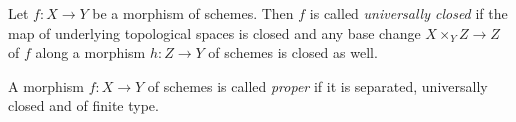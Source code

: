 
\begin{definition}
	Let $f\colon X\to Y$ be a morphism of schemes. Then $f$ is called \emph{universally closed} if the map of underlying topological spaces is closed and any base change $X\times_Y Z\to Z$ of $f$ along a morphism $h\colon Z\to Y$ of schemes is closed as well.
\end{definition}

\begin{definition}
	
	A morphism $f\colon X\to Y$ of schemes is called \emph{proper} if it is separated, universally closed and of finite type.
\end{definition}


